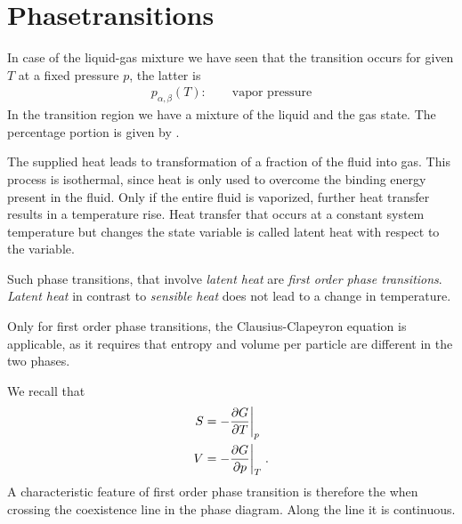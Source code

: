 \section{Phasetransitions}

In case of the liquid-gas mixture we have seen that the transition occurs for given $T$ at a fixed pressure $p$, the latter is
%
\begin{align*}
p_{\alpha,\beta}(T):\qquad\text{vapor pressure} 
\end{align*}
%
In the transition region we have a mixture of the liquid and the gas state. The percentage portion is given by .

The supplied heat leads to transformation of a fraction of the  fluid into gas. This process is isothermal, since heat is only used to overcome the binding energy present in the fluid.
Only if the entire  fluid is vaporized, further heat transfer results in a temperature rise.
Heat transfer that occurs at a constant system temperature but changes the state variable is 
called latent heat with respect to the variable.

Such phase transitions, that involve {\em latent heat} are {\em first order phase transitions}.
{\em Latent heat} in contrast to {\em sensible heat} does not lead to a change in temperature.

Only for first order phase transitions, the Clausius-Clapeyron equation is applicable, as it 
requires that entropy and volume per particle are different in the two phases.

We recall that 
%
\begin{align}\label{eq:}
S &= -\frac{\partial G}{\partial T}\bigg|_{p}\\
V &= -\frac{\partial G}{\partial p}\bigg|_{T}\;.
\end{align}
%
A characteristic feature of first order phase transition is therefore the  when crossing the coexistence line in the phase diagram.
Along the line it is continuous.

